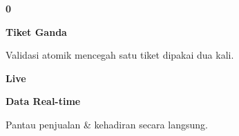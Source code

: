 \documentclass[a4paper]{article}
\begin{document}
\begin{minipage}[t]{0.485\textwidth}
    \noindent\colorbox{BlueBg}{%
        \begin{minipage}[t][2.7cm][c]{\dimexpr\linewidth-2\fboxsep\relax}
            \centering
            {\fontsize{20}{24}\selectfont\bfseries\color{BluePrimary} 0}\par\vspace{2pt}
            {\fontsize{9.5}{12}\selectfont\bfseries\color{BlueDark} Tiket Ganda}\par\vspace{2pt}
            {\fontsize{8.5}{11}\selectfont\color{TextDark}Validasi atomik mencegah satu tiket dipakai dua kali.}
        \end{minipage}}\par
    \vspace{6pt}
    \noindent\colorbox{BlueBg}{%
        \begin{minipage}[t][2.7cm][c]{\dimexpr\linewidth-2\fboxsep\relax}
            \centering
            {\fontsize{20}{24}\selectfont\bfseries\color{BluePrimary} Live}\par\vspace{2pt}
            {\fontsize{9.5}{12}\selectfont\bfseries\color{BlueDark} Data Real-time}\par\vspace{2pt}
            {\fontsize{8.5}{11}\selectfont\color{TextDark}Pantau penjualan \& kehadiran secara langsung.}
        \end{minipage}}%
\end{minipage}

\vspace{8pt}
\end{document}
